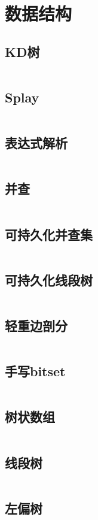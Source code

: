 \documentclass[UTF8]{ctexart}
\begin{document}
\section{数据结构}
\subsection{KD树}
\inputminted{cpp}{datastructure/KD树.cpp}
\subsection{Splay}
\inputminted{cpp}{datastructure/Splay.cpp}
\subsection{表达式解析}
\inputminted{cpp}{datastructure/表达式解析.cpp}
\subsection{并查}
\inputminted{cpp}{datastructure/并查.cpp}
\subsection{可持久化并查集}
\inputminted{cpp}{datastructure/可持久化并查集.cpp}
\subsection{可持久化线段树}
\inputminted{cpp}{datastructure/可持久化线段树.cpp}
\subsection{轻重边剖分}
\inputminted{cpp}{datastructure/轻重边剖分.cpp}
\subsection{手写bitset}
\inputminted{cpp}{datastructure/手写bitset.cpp}
\subsection{树状数组}
\inputminted{cpp}{datastructure/树状数组.cpp}
\subsection{线段树}
\inputminted{cpp}{datastructure/线段树.cpp}
\subsection{左偏树}
\inputminted{cpp}{datastructure/左偏树.cpp}
\end{document}
